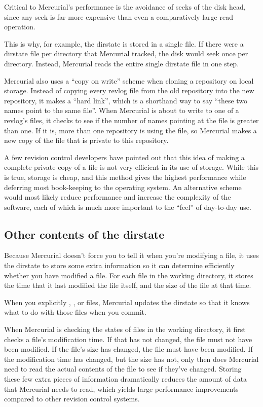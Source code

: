 Critical to Mercurial's performance is the avoidance of seeks of the
disk head, since any seek is far more expensive than even a
comparatively large read operation.

This is why, for example, the dirstate is stored in a single file.  If
there were a dirstate file per directory that Mercurial tracked, the
disk would seek once per directory.  Instead, Mercurial reads the
entire single dirstate file in one step.

Mercurial also uses a ``copy on write'' scheme when cloning a
repository on local storage.  Instead of copying every revlog file
from the old repository into the new repository, it makes a ``hard
link'', which is a shorthand way to say ``these two names point to the
same file''.  When Mercurial is about to write to one of a revlog's
files, it checks to see if the number of names pointing at the file is
greater than one.  If it is, more than one repository is using the
file, so Mercurial makes a new copy of the file that is private to
this repository.

A few revision control developers have pointed out that this idea of
making a complete private copy of a file is not very efficient in its
use of storage.  While this is true, storage is cheap, and this method
gives the highest performance while deferring most book-keeping to the
operating system.  An alternative scheme would most likely reduce
performance and increase the complexity of the software, each of which
is much more important to the ``feel'' of day-to-day use.

\subsection{Other contents of the dirstate}

Because Mercurial doesn't force you to tell it when you're modifying a
file, it uses the dirstate to store some extra information so it can
determine efficiently whether you have modified a file.  For each file
in the working directory, it stores the time that it last modified the
file itself, and the size of the file at that time.  

When you explicitly , ,  or
 files, Mercurial updates the dirstate so that it knows
what to do with those files when you commit.

When Mercurial is checking the states of files in the working
directory, it first checks a file's modification time.  If that has
not changed, the file must not have been modified.  If the file's size
has changed, the file must have been modified.  If the modification
time has changed, but the size has not, only then does Mercurial need
to read the actual contents of the file to see if they've changed.
Storing these few extra pieces of information dramatically reduces the
amount of data that Mercurial needs to read, which yields large
performance improvements compared to other revision control systems.

